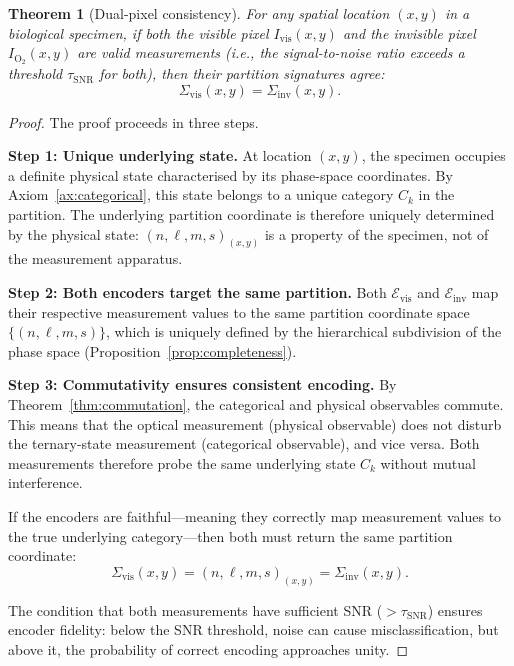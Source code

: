 \documentclass[11pt,twocolumn,a4paper]{article}
\newtheorem{theorem}{Theorem}
\newcommand{\Sigvis}{\Sigma_{\mathrm{vis}}}
\newcommand{\Siginv}{\Sigma_{\mathrm{inv}}}
\begin{document}
\begin{theorem}[Dual-pixel consistency]\label{thm:consistency}
For any spatial location $(x,y)$ in a biological specimen, if both the visible pixel $I_{\mathrm{vis}}(x,y)$ and the invisible pixel $I_{\mathrm{O}_2}(x,y)$ are valid measurements (i.e., the signal-to-noise ratio exceeds a threshold $\tau_{\mathrm{SNR}}$ for both), then their partition signatures agree:
\begin{equation}\label{eq:consistency}
\Sigvis(x,y) = \Siginv(x,y).
\end{equation}
\end{theorem}
\begin{proof}
The proof proceeds in three steps.

\textbf{Step 1: Unique underlying state.}
At location $(x,y)$, the specimen occupies a definite physical state characterised by its phase-space coordinates.
By Axiom~\ref{ax:categorical}, this state belongs to a unique category $C_k$ in the partition.
The underlying partition coordinate is therefore uniquely determined by the physical state: $(n,\ell,m,s)_{(x,y)}$ is a property of the specimen, not of the measurement apparatus.

\textbf{Step 2: Both encoders target the same partition.}
Both $\mathcal{E}_{\mathrm{vis}}$ and $\mathcal{E}_{\mathrm{inv}}$ map their respective measurement values to the same partition coordinate space $\{(n,\ell,m,s)\}$, which is uniquely defined by the hierarchical subdivision of the phase space (Proposition~\ref{prop:completeness}).

\textbf{Step 3: Commutativity ensures consistent encoding.}
By Theorem~\ref{thm:commutation}, the categorical and physical observables commute.
This means that the optical measurement (physical observable) does not disturb the ternary-state measurement (categorical observable), and vice versa.
Both measurements therefore probe the same underlying state $C_k$ without mutual interference.

If the encoders are faithful---meaning they correctly map measurement values to the true underlying category---then both must return the same partition coordinate:
\begin{equation}
\Sigvis(x,y) = (n,\ell,m,s)_{(x,y)} = \Siginv(x,y).
\end{equation}

The condition that both measurements have sufficient SNR ($> \tau_{\mathrm{SNR}}$) ensures encoder fidelity: below the SNR threshold, noise can cause misclassification, but above it, the probability of correct encoding approaches unity.
\end{proof}
\end{document}
